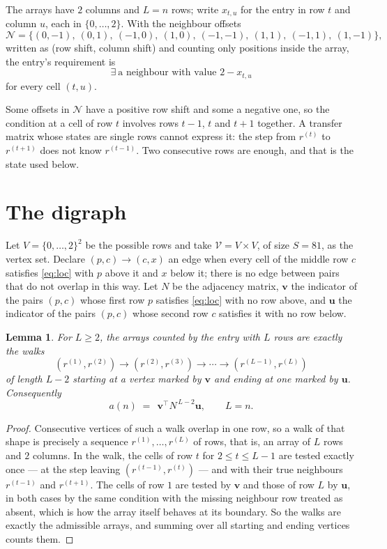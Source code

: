 \documentclass[11pt,a4paper]{article}
\theoremstyle{plain}
\newtheorem{lemma}[theorem]{Lemma}
\theoremstyle{definition}
\begin{document}
The arrays have $2$ columns and $L=n$ rows; write $x_{t,u}$ for the entry in
row $t$ and column $u$, each in $\{0,\dots,2\}$. With the neighbour offsets
\[
\mathcal N=\{(0,-1),\ (0,1),\ (-1,0),\ (1,0),\ (-1,-1),\ (1,1),\ (-1,1),\ (1,-1)\},
\]
written as (row shift, column shift) and counting only positions inside the array, the
entry's requirement is
\begin{equation}\label{eq:loc}
\exists\ \text{a neighbour with value }2-x_{t,u}
\end{equation}
for every cell $(t,u)$.

Some offsets in $\mathcal N$ have a positive row shift and some a negative one, so the
condition at a cell of row $t$ involves rows $t-1$, $t$ and $t+1$ together. A transfer
matrix whose states are single rows cannot express it: the step from $r^{(t)}$ to
$r^{(t+1)}$ does not know $r^{(t-1)}$. Two consecutive rows are enough, and that is
the state used below.

\section{The digraph}

Let $V=\{0,\dots,2\}^{2}$ be the possible rows and take
$\mathcal V=V\times V$, of size $S=81$, as the vertex set. Declare $(p,c)\to(c,x)$ an edge
when every cell of the middle row $c$ satisfies \eqref{eq:loc} with $p$ above it and $x$
below it; there is no edge between pairs that do not overlap in this way. Let $N$ be the
adjacency matrix, $\mathbf{v}$ the indicator of the pairs $(p,c)$ whose first row $p$
satisfies \eqref{eq:loc} with no row above, and $\mathbf{u}$ the indicator of
the pairs $(p,c)$ whose second row $c$ satisfies it with no row below.

\begin{lemma}\label{lem:walk}
For $L\ge2$, the arrays counted by the entry with $L$ rows are exactly the walks
\[
(r^{(1)},r^{(2)})\to(r^{(2)},r^{(3)})\to\cdots\to(r^{(L-1)},r^{(L)})
\]
of length $L-2$ starting at a vertex marked by $\mathbf{v}$ and ending at one marked by
$\mathbf{u}$. Consequently
\[
a(n)\;=\;\,\mathbf{v}^{\!\top}N^{\,L-2}\mathbf{u},\qquad L=n .
\]
\end{lemma}

\begin{proof}
Consecutive vertices of such a walk overlap in one row, so a walk of that shape is
precisely a sequence $r^{(1)},\dots,r^{(L)}$ of rows, that is, an array of $L$ rows
and $2$ columns. In the walk, the cells of row $t$ for $2\le t\le L-1$ are tested
exactly once --- at the step leaving $(r^{(t-1)},r^{(t)})$ --- and with their true
neighbours $r^{(t-1)}$ and $r^{(t+1)}$. The cells of row $1$ are tested by
$\mathbf{v}$ and those of row $L$ by $\mathbf{u}$, in both cases by the same condition
with the missing neighbour row treated as absent, which is how the array itself behaves at
its boundary. So the walks are exactly the admissible arrays, and summing over all starting
and ending vertices counts them.
\end{proof}
\end{document}
